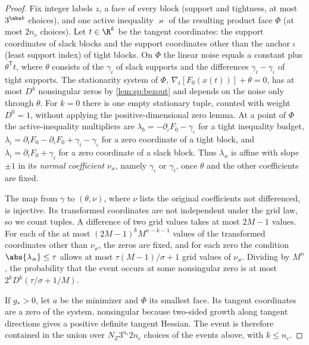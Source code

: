 \begin{proof}
Fix integer labels $z$, a face of every block (support and tightness, at most
$3^{\abs b}$ choices), and one active inequality $\varkappa$ of the resulting
product face $\Phi$ (at most $2n_c$ choices). Let $t\in\R^k$ be the tangent
coordinates: the support coordinates of slack blocks and the support
coordinates other than the anchor $\iota$ (least support index) of tight
blocks. On $\Phi$ the linear noise equals a constant plus
$\theta^{\mathsf T}t$, where $\theta$ consists of the $\gamma_i$ of slack
supports and the differences $\gamma_i-\gamma_\iota$ of tight supports. The
stationarity system of $\Phi$, $\nabla_t[F_0(x(t))]+\theta=0$, has at most
$D^k$ nonsingular zeros by \cref{lem:sp:bezout} and depends on the noise only
through $\theta$. For $k=0$ there is one empty stationary tuple, counted
with weight $D^0=1$, without applying the positive-dimensional zero lemma.
At a point of $\Phi$ the active-inequality multipliers are
$\lambda_b=-\partial_\iota F_0-\gamma_\iota$ for a tight inequality budget,
$\lambda_i=\partial_iF_0-\partial_\iota F_0+\gamma_i-\gamma_\iota$ for a zero
coordinate of a tight block, and $\lambda_i=\partial_iF_0+\gamma_i$ for a zero
coordinate of a slack block. Thus $\lambda_\varkappa$ is affine with slope
$\pm1$ in its \emph{normal coefficient} $\nu_\varkappa$, namely $\gamma_\iota$
or $\gamma_i$, once $\theta$ and the other coefficients are fixed.

The map from $\gamma$ to $(\theta,\nu)$, where $\nu$ lists the original
coefficients not differenced, is injective. Its transformed coordinates are
not independent under the grid law, so we count tuples. A difference of two
grid values takes at most $2M-1$ values. For each of the at most
$(2M-1)^kM^{n-k-1}$ values of the transformed coordinates other than
$\nu_\varkappa$, the zeros are fixed, and for each zero the condition
$\abs{\lambda_\varkappa}\le\tau$ allows at most $\tau(M-1)/\sigma+1$ grid values
of $\nu_\varkappa$. Dividing by $M^n$, the probability that the event occurs
at some nonsingular zero is at most $2^kD^k(\tau/\sigma+1/M)$.

If $g_*>0$, let $a$ be the minimizer and $\Phi$ its smallest face. Its
tangent coordinates are a zero of the system, nonsingular because two-sided
growth along tangent directions gives a positive definite tangent Hessian.
The event is therefore contained in the union over $N_Z3^{n_c}2n_c$ choices
of the events above, with $k\le n_c$.
\end{proof}


